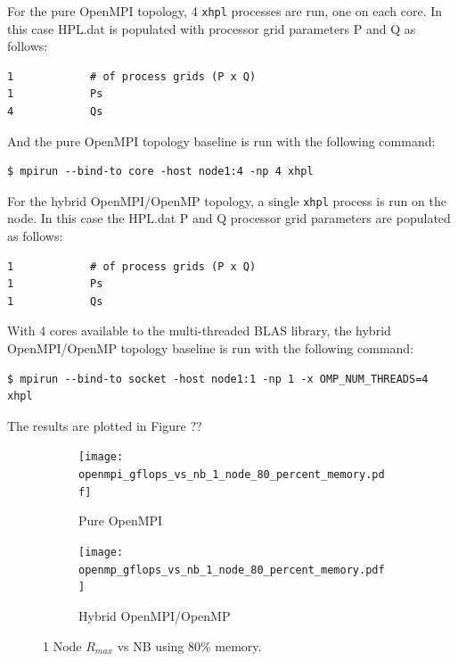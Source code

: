 \documentclass{report}
\begin{document}
For the pure OpenMPI topology, 4 \verb|xhpl| processes are run, one on each core. In this case HPL.dat is populated with processor grid parameters P and Q as follows:

\lstset{style=listing}
\begin{lstlisting}[numbers=none]
1            # of process grids (P x Q)
1            Ps
4            Qs
\end{lstlisting}

And the pure OpenMPI topology baseline is run with the following command:

\lstset{style=type}
\begin{lstlisting}[]
$ mpirun --bind-to core -host node1:4 -np 4 xhpl
\end{lstlisting}

For the hybrid OpenMPI/OpenMP topology, a single \verb|xhpl| process is run on the node. In this case the HPL.dat P and Q processor grid parameters are populated as follows:

\lstset{style=listing}
\begin{lstlisting}[numbers=none]
1            # of process grids (P x Q)
1            Ps
1            Qs
\end{lstlisting}

With 4 cores available to the multi-threaded BLAS library, the hybrid OpenMPI/OpenMP topology baseline is run with the following command:

\lstset{style=type}
\begin{lstlisting}[]
$ mpirun --bind-to socket -host node1:1 -np 1 -x OMP_NUM_THREADS=4 xhpl
\end{lstlisting}

The results are plotted in Figure ??

\begin{figure}[H]
	\begin{subfigure}{1.0\textwidth}
		\centering
		\texttt{[image: openmpi\_gflops\_vs\_nb\_1\_node\_80\_percent\_memory.pdf]}
		\caption{Pure OpenMPI}
		\label{fig:subim1}
	\end{subfigure}
	\par\bigskip
	\begin{subfigure}{1.0\textwidth}
		\centering
		\texttt{[image: openmp\_gflops\_vs\_nb\_1\_node\_80\_percent\_memory.pdf]}
		\caption{Hybrid OpenMPI/OpenMP}
		\label{fig:subim2}
	\end{subfigure}
\caption{1 Node $R_{max}$ vs NB using 80\% memory.}
\label{fig:image2}
\end{figure}
\end{document}
